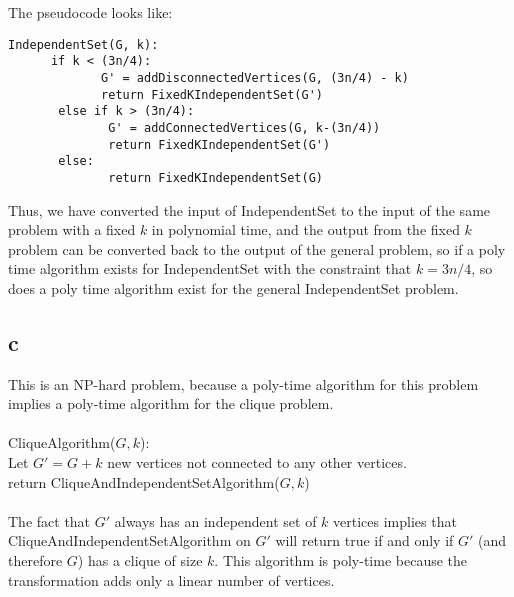 \documentclass[letterpaper,notitlepage,twoside]{article}
\newcommand\tab[1][1cm]{\hspace*{#1}} %
\begin{document}
The pseudocode looks like:
\begin{verbatim}
IndependentSet(G, k):
      if k < (3n/4):
             G' = addDisconnectedVertices(G, (3n/4) - k)
             return FixedKIndependentSet(G')
       else if k > (3n/4):
              G' = addConnectedVertices(G, k-(3n/4))
              return FixedKIndependentSet(G')
       else:
              return FixedKIndependentSet(G)
\end{verbatim}
Thus, we have converted the input of IndependentSet to the input of the same problem with a fixed $k$ in polynomial time, and the output from the fixed $k$ problem can be converted back to the output of the general problem, so if a poly time algorithm exists for IndependentSet with the constraint that $k=3n/4$, so does a poly time algorithm exist for the general IndependentSet problem. 
\subsection*{c}
This is an NP-hard problem, because a poly-time algorithm for this problem implies a poly-time algorithm for the clique problem.
\\\\
CliqueAlgorithm($G, k$):\\
\tab Let $G' = G + k$ new vertices not connected to any other vertices.\\
\tab return CliqueAndIndependentSetAlgorithm($G, k$)
\\\\
The fact that $G'$ always has an independent set of $k$ vertices implies that CliqueAndIndependentSetAlgorithm on $G'$ will return true if and only if $G'$ (and therefore $G$) has a clique of size $k$. This algorithm is poly-time because the transformation adds only a linear number of vertices.
\end{document}
